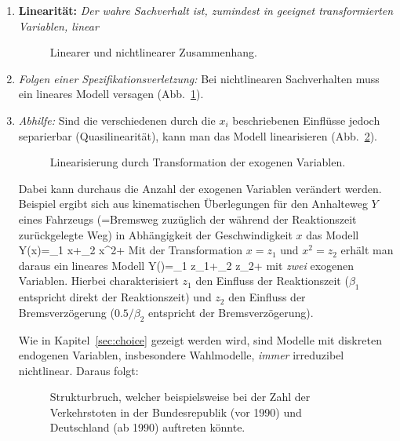 \begin{enumerate}
\item \textbf{Linearit\"at:} \emph{Der wahre Sachverhalt ist, zumindest in
geeignet transformierten Variablen, linear} 

\begin{figure}
\caption{\label{fig:linear}Linearer und nichtlinearer Zusammenhang.}
\end{figure}
\bi
\item \textit{Folgen einer Spezifikationsverletzung:}
Bei nichtlinearen Sachverhalten muss ein lineares Modell versagen
(Abb.~\ref{fig:linear}).

\item \textit{Abhilfe:}
 Sind die verschiedenen durch die $x_i$
beschriebenen Einfl\"usse jedoch separierbar (Quasilinearit\"at), kann
man das Modell linearisieren (Abb.~\ref{fig:quasilinear}).

\begin{figure}
\caption{\label{fig:quasilinear}Linearisierung durch Transformation
der exogenen Variablen.}
\end{figure}


Dabei kann durchaus die Anzahl der exogenen Variablen ver\"andert
werden. Beispiel ergibt sich aus kinematischen \"Uberlegungen f\"ur
den Anhalteweg $Y$ eines Fahrzeugs (=Bremsweg zuz\"uglich der w\"ahrend
der Reaktionszeit zu\-r\"uck\-ge\-leg\-te Weg) in Abh\"angigkeit der
Geschwindigkeit $x$ das Modell
\bdm
Y(x)=\beta_1 x+\beta_2 x^2+\epsilon
\edm
Mit der Transformation $x=z_1$ und $x^2=z_2$ erh\"alt man daraus ein
lineares Modell 
\bdm
Y()=\beta_1 z_1+\beta_2 z_2+\epsilon
\edm
mit \emph{zwei} exogenen Variablen. Hierbei charakterisiert $z_1$ den
Einfluss der Reaktionszeit ($\beta_1$ entspricht direkt der
Reaktionszeit) und $z_2$ den Einfluss der Bremsverz\"ogerung
($0.5/\beta_2$ entspricht  der
Bremsverz\"ogerung).

Wie in Kapitel~\ref{sec:choice} gezeigt werden wird, sind Modelle mit
diskreten endogenen Variablen, insbesondere Wahlmodelle,
\textit{immer} irreduzibel nichtlinear. Daraus folgt:
\ei


\begin{figure}
\caption{\label{fig:strukturbruch}Strukturbruch, welcher
beispielsweise bei der Zahl der
Verkehrstoten in der Bundesrepublik (vor 1990) und Deutschland (ab
1990) auftreten k\"onnte.}
\end{figure}


\end{enumerate}

